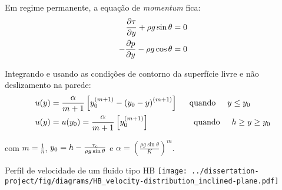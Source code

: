 \begin{frame}
    \hspace{0.5cm} Em regime permanente, a equação de \textit{momentum} fica:
    \begin{equation}
        \begin{split}
            \frac{\partial \tau}{\partial y} + \rho g \sin{\theta} &= 0 \\
            -\frac{\partial p}{\partial y} - \rho g \cos{\theta} &= 0
        \end{split}
        \label{eq:motion_steady_state_partial}
    \end{equation}

    \hspace{0.5cm} Integrando e usando as condições de contorno da superfície livre e não deslizamento na parede:
    \begin{equation}
        \begin{split}
            u(y) &= \frac{\alpha}{m+1} \left[y_0^{(m+1)} - {(y_0-y)}^{(m+1)}\right]
            \hspace{0.5cm} \text{quando} \hspace{0.5cm} y \leq y_0
            \\
            u(y) &= u(y_0) = \frac{\alpha}{m+1} \left[ y_0^{(m+1)} \right]
            \hspace{1.9cm} \text{quando} \hspace{0.5cm} h \geq y \geq y_0
        \end{split}
        \label{eq:velocity_distribution}
    \end{equation}
    
    com $m=\frac{1}{n}$, $y_0 = h - \frac{\tau_c}{\rho g \sin{\theta}}$ e $\alpha = \left({\frac{\rho g \sin{\theta}}{K}}\right)^m$.
\end{frame}

\begin{frame}
    \begin{exampleblock}{Perfil de velocidade de um fluido tipo HB}
        \centering
        \texttt{[image: ../dissertation-project/fig/diagrams/HB\_velocity-distribution\_inclined-plane.pdf]}
    \end{exampleblock}
\end{frame}